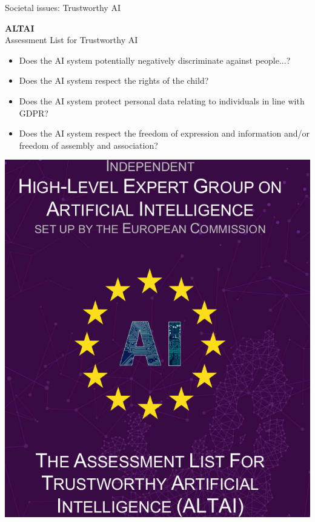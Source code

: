 \documentclass[10pt,serif,mathserif,compress,hyperref={colorlinks}]{beamer}
\begin{document}
\begin{frame}{Societal issues: Trustworthy AI}

  \hspace*{-5mm}
  \begin{minipage}{.5\textwidth}
    {\Large\bf ALTAI}\\
    Assessment List for Trustworthy AI
  \begin{itemize}
  \item Does the AI system potentially negatively discriminate against people...?
  \item Does the AI system respect the rights of the child?
  \item Does the AI system protect personal data relating to individuals in line with GDPR?
  \item Does the AI system respect the freedom of expression and information and/or freedom of
    assembly and association?
  \end{itemize}
  \end{minipage}\begin{minipage}{1.\textwidth}
   \hspace*{2mm}\vspace*{-2mm}
  \includegraphics[width=.6\textwidth]{images/ALTAI.png}
  \end{minipage}
  
\end{frame}
\end{document}
